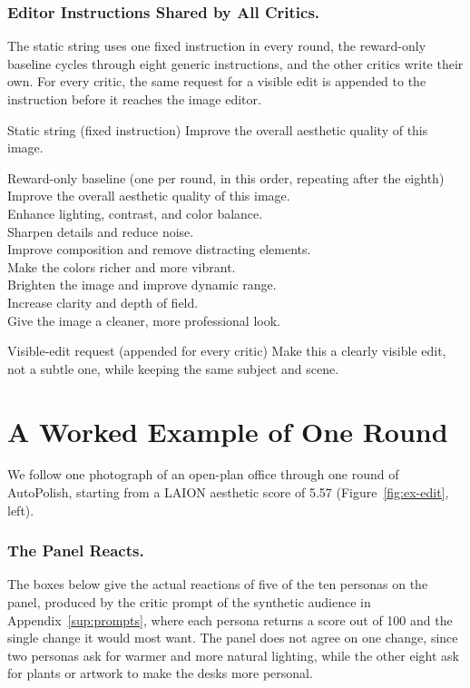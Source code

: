 \documentclass[runningheads]{llncs}
\begin{document}
\subsubsection{Editor Instructions Shared by All Critics.} The static string uses one fixed instruction in every round, the reward-only baseline cycles through eight generic instructions, and the other critics write their own. For every critic, the same request for a visible edit is appended to the instruction before it reaches the image editor.
\begin{promptbox}{Static string (fixed instruction)}
\ttfamily
Improve the overall aesthetic quality of this image.
\end{promptbox}
\begin{promptbox}{Reward-only baseline (one per round, in this order, repeating after the eighth)}
\ttfamily
Improve the overall aesthetic quality of this image.\\
Enhance lighting, contrast, and color balance.\\
Sharpen details and reduce noise.\\
Improve composition and remove distracting elements.\\
Make the colors richer and more vibrant.\\
Brighten the image and improve dynamic range.\\
Increase clarity and depth of field.\\
Give the image a cleaner, more professional look.
\end{promptbox}
\begin{promptbox}{Visible-edit request (appended for every critic)}
\ttfamily
Make this a clearly visible edit, not a subtle one, while keeping the same subject and scene.
\end{promptbox}

\section{A Worked Example of One Round}
\label{sup:example}
We follow one photograph of an open-plan office through one round of AutoPolish, starting from a LAION aesthetic score of 5.57 (Figure~\ref{fig:ex-edit}, left).

\subsubsection{The Panel Reacts.} The boxes below give the actual reactions of five of the ten personas on the panel, produced by the critic prompt of the synthetic audience in Appendix~\ref{sup:prompts}, where each persona returns a score out of 100 and the single change it would most want. The panel does not agree on one change, since two personas ask for warmer and more natural lighting, while the other eight ask for plants or artwork to make the desks more personal.
\end{document}
